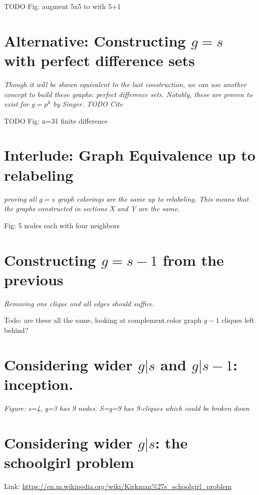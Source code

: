 \documentclass[11pt, oneside]{article} 	%
\begin{document}
TODO Fig: augment 5x5 to with 5+1



\section{Alternative: Constructing $g=s$ with perfect difference sets}
\emph{Though it will be shown equivalent to the last construction, we can use another concept to build these graphs: perfect difference sets.  Notably, these are proven to exist for $g=p^k$ by Singer. TODO Cite}




TODO Fig: n=31 finite difference



\section{Interlude: Graph Equivalence up to relabeling}

\emph{proving all $g=s$ graph colorings are the same up to relabeling.  This means that the  graphs constructed in sections X and Y are the same.}




Fig: 5 nodes each with four neighbors



\section{Constructing $g=s-1$ from the previous}

\emph{Removing one clique and all edges should suffice.}

Todo: are these all the same, looking at complement.color graph $g-1$ cliques left behind?



\section{Considering wider $g | s$ and $g | s-1$: inception.}


\emph{Figure: s=4, g=3 has 9 nodes.  S=g=9 has 9-cliques which could be broken down }




\section{Considering wider $g|s$: the schoolgirl problem}

Link: \url{https://en.m.wikipedia.org/wiki/Kirkman\%27s_schoolgirl_problem}
\end{document}
